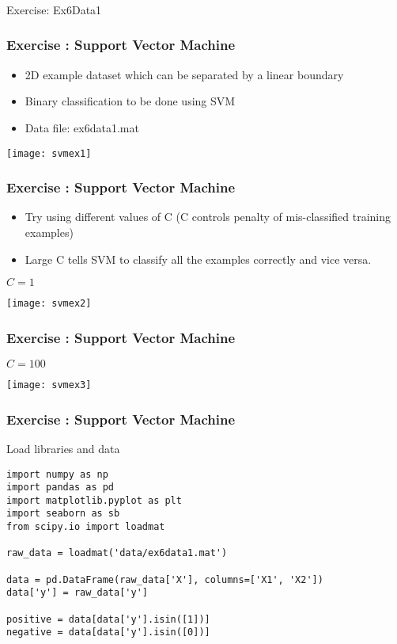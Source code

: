 \begin{frame}[fragile]\frametitle{}
\begin{center}
{\Large Exercise: Ex6Data1}
\end{center}
\end{frame}


\begin{frame}[fragile]\frametitle{Exercise : Support Vector Machine}
\begin{itemize}
\item 2D example dataset which can be separated by a linear boundary
\item Binary classification to be done using SVM
\item Data file: ex6data1.mat
\end{itemize}
\begin{center}
\texttt{[image: svmex1]}
\end{center}
\end{frame}

\begin{frame}[fragile]\frametitle{Exercise : Support Vector Machine}
\begin{itemize}
\item Try using different values of C (C controls penalty of mis-classified training examples)
\item Large C tells SVM to classify all the examples correctly and vice versa.
\end{itemize}
$C=1$
\begin{center}
\texttt{[image: svmex2]}
\end{center}
\end{frame}

\begin{frame}[fragile]\frametitle{Exercise : Support Vector Machine}
$C=100$
\begin{center}
\texttt{[image: svmex3]}
\end{center}
\end{frame}

\begin{frame}[fragile]\frametitle{Exercise : Support Vector Machine}
Load libraries and data
\begin{lstlisting}
import numpy as np
import pandas as pd
import matplotlib.pyplot as plt
import seaborn as sb
from scipy.io import loadmat

raw_data = loadmat('data/ex6data1.mat')

data = pd.DataFrame(raw_data['X'], columns=['X1', 'X2'])
data['y'] = raw_data['y']

positive = data[data['y'].isin([1])]
negative = data[data['y'].isin([0])]
\end{lstlisting}
\end{frame}

